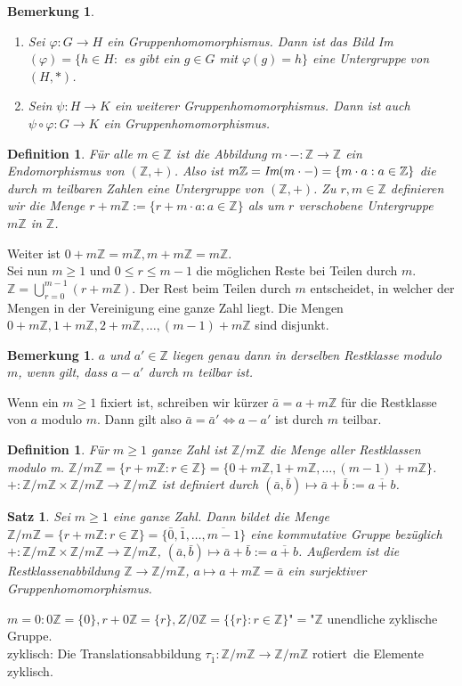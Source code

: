 \documentclass[12pt,a4paper]{article}
\theoremstyle{plain}
\newtheorem{Satz}[Theorem]{Satz}
\newtheorem{Definition}[Theorem]{Definition}
\newtheorem{Bemerkung}[Theorem]{Bemerkung}
\newcommand{\Z}{\mathbb{Z}}
\numberwithin{equation}{section}
\begin{document}
\begin{Bemerkung}\ 
\begin{enumerate}
\renewcommand{\labelenumi}{(\alph{enumi})}
\item Sei $\varphi:G\rightarrow H$ ein Gruppenhomomorphismus. Dann ist das Bild Im$(\varphi)=\{h\in H:$ es gibt ein $g\in G$ mit $\varphi(g)=h\}$ eine Untergruppe von $(H,*)$.
\item Sein $\psi: H\rightarrow K$ ein weiterer Gruppenhomomorphismus. Dann ist auch $\psi\circ\varphi:G\rightarrow K$ ein Gruppenhomomorphismus.
\end{enumerate}
\end{Bemerkung}
\begin{Definition}
Für alle $m\in\Z$ ist die Abbildung $m\cdot - :\Z\rightarrow\Z$ ein Endomorphismus von $(\Z,+)$. Also ist $m\Z=\emph{Im}(m\cdot -)=\{m\cdot a: a\in \Z\}$ die durch m teilbaren Zahlen eine Untergruppe von $(\Z,+)$.
Zu $r,m \in \Z$ definieren wir die Menge $r + m\Z:=\{r+m\cdot a: a\in \Z\}$ als um $r$ verschobene Untergruppe $m\Z$ in $\Z$.
\end{Definition}
Weiter ist $0+m\Z=m\Z, m+m\Z=m\Z$.\\
Sei nun $m\geq 1$ und $0\leq r\leq m-1$ \glqq die möglichen Reste bei Teilen durch $m$\grqq. $\Z=\bigcup_{r=0}^{m-1}{(r+m\Z)}$. Der Rest beim Teilen durch $m$ entscheidet, in welcher der Mengen in der Vereinigung eine ganze Zahl liegt. Die Mengen $0+m\Z,1+m\Z,2+m\Z,\ldots,(m-1)+m\Z$ sind disjunkt.
\begin{Bemerkung}
$a$ und $a'\in \Z$ liegen genau dann in derselben Restklasse modulo $m$, wenn gilt, dass $a-a'$ durch $m$ teilbar ist.
\end{Bemerkung}
Wenn ein $m\geq 1$ fixiert ist, schreiben wir kürzer $\bar{a}=a+m\Z$ für die Restklasse von $a$ modulo $m$. Dann gilt also $\bar{a}=\bar{a}' \Leftrightarrow a-a'$ ist durch $m$ teilbar.
\begin{Definition}
Für $m\geq 1$ ganze Zahl ist $\Z/m\Z$ die Menge aller Restklassen modulo m. $\Z/m\Z=\{r+m\Z:r\in\Z\}=\{0+m\Z,1+m\Z,\ldots,(m-1)+m\Z\}$. $+:\Z/m\Z\times\Z/m\Z\rightarrow\Z/m\Z$ ist definiert durch $(\bar{a},\bar{b})\mapsto \bar{a}+\bar{b}:=\overline{a+b}$. 
\end{Definition}
\begin{Satz}
Sei $m\geq 1$ eine ganze Zahl. Dann bildet die Menge $\Z/m\Z=\{r+m\Z: r\in \Z\}=\{\bar{0},\bar{1},\ldots,\overline{m-1}\}$ eine kommutative Gruppe bezüglich $+:\Z/m\Z\times\Z/m\Z\rightarrow\Z/m\Z$, $(\bar{a},\bar{b})\mapsto \bar{a}+\bar{b}:=\overline{a+b}$. Außerdem ist die Restklassenabbildung $\Z\rightarrow \Z/m\Z$, $ a\mapsto a+m\Z=\bar{a}$ ein surjektiver Gruppenhomomorphismus.
\end{Satz}
$m=0: 0\Z=\{0\}, r+0\Z=\{r\}, Z/0\Z=\{\{r\}:r\in\Z\}$"$=$"$\Z$ unendliche zyklische Gruppe.\\
zyklisch: Die Translationsabbildung $\tau_{\bar{1}}:\Z/m\Z\rightarrow\Z/m\Z$ \glqq rotiert\grqq\ die Elemente zyklisch.
\end{document}
